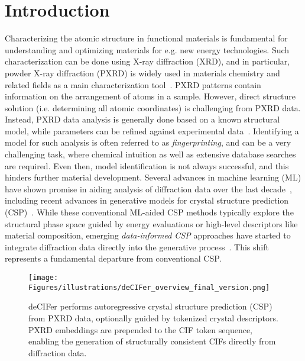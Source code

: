\section{Introduction}

Characterizing the atomic structure in functional materials is fundamental for understanding and optimizing materials for e.g. new energy technologies. Such characterization can be done using X-ray diffraction (XRD), and in particular, powder X-ray diffraction (PXRD) is widely used in materials chemistry and related fields as a main characterization tool~\cite{Cheetham2014}. PXRD patterns contain information on the arrangement of atoms in a sample. However, direct structure solution (i.e. determining all atomic coordinates) is challenging from PXRD data. Instead, PXRD data analysis is generally done based on a known structural model, while parameters can be refined against experimental data~\cite{young1995rietveld}. Identifying a model for such analysis is often referred to as \textit{fingerprinting}, and can be a very challenging task, where chemical intuition as well as extensive database searches are required. Even then, model identification is not always successful, and this hinders further material development. Several advances in machine learning (ML) have shown promise in aiding analysis of diffraction data over the last decade~\cite{Tatlier2011, Bunn2016, Oviedo2019, Wang2020}, including recent advances in generative models for crystal structure prediction (CSP)~\cite{jiao2023crystal, mohanty2024crystext, antunes2024crystalstructuregenerationautoregressive}. While these conventional ML-aided CSP methods typically explore the structural phase space guided by energy evaluations or high-level descriptors like material composition, emerging \textit{data-informed CSP} approaches have started to integrate diffraction data directly into the generative process~\cite{kjaer2023deepstruc, guo2024abinitiostructuresolutions, riesel2024crystal, lai2025endtoendcrystalstructureprediction}. This shift represents a fundamental departure from conventional CSP.

\begin{figure}[ht]
\vskip 0.2in
\begin{center}
\centerline{\texttt{[image: Figures/illustrations/deCIFer\_overview\_final\_version.png]}}
\caption{deCIFer performs autoregressive crystal structure prediction (CSP) from PXRD data, optionally guided by tokenized crystal descriptors. PXRD embeddings are prepended to the CIF token sequence, enabling the generation of structurally consistent CIFs directly from diffraction data.} \label{fig:overview}
\end{center}
\end{figure}


